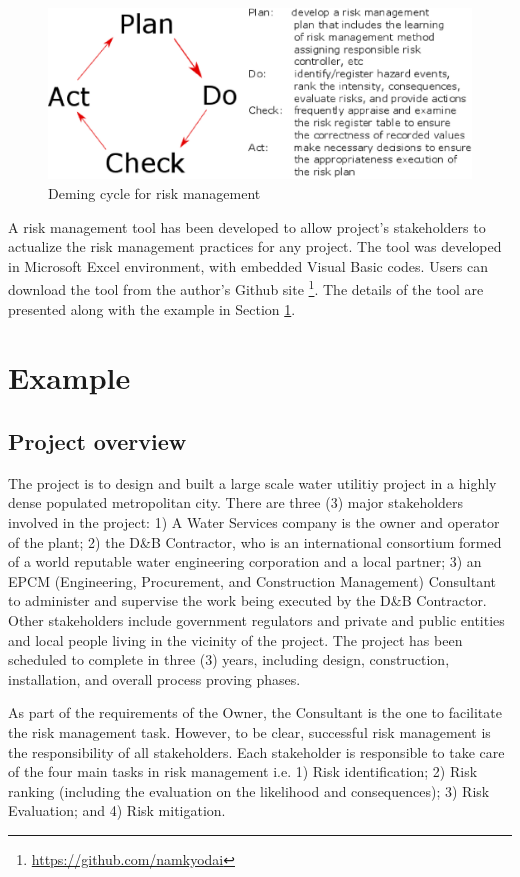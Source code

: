 \documentclass[10pt,halfline,a4paper]{ouparticle}
\let\oldurl\url
\let\linkurl\url
\let\url\oldurl
\begin{document}
\begin{figure}[!ht]
	\centering \includegraphics[scale=0.4]{demingcyclerisk} \caption{Deming cycle for risk management}
	\label{demingcyclerisk} 
\end{figure}

A risk management tool has been developed to allow project's stakeholders to actualize the risk management practices for any project. The tool was developed in Microsoft Excel environment, with embedded Visual Basic codes. Users can download the tool from the author's Github site \footnote{\linkurl{https://github.com/namkyodai}}. The details of the tool are presented along with the example in Section \ref{sec5}.

\section{Example}
\label{sec5}
\subsection{Project overview}
The project is to design and built a large scale water utilitiy project in a highly dense populated metropolitan city. There are three (3) major stakeholders involved in the project: 1) A Water Services company is the owner and operator of the plant; 2) the D\&B Contractor, who is an international consortium formed of a world reputable water engineering corporation and a local partner; 3) an EPCM (Engineering, Procurement, and Construction Management) Consultant to administer and supervise the work being executed by the D\&B Contractor. Other stakeholders include government regulators and private and public entities and local people living in the vicinity of the project. The project has been scheduled to complete in three (3) years, including design, construction, installation, and overall process proving phases.

As part of the requirements of the Owner, the Consultant is the one to facilitate the risk management task. However, to be clear, successful risk management is the responsibility of all stakeholders. Each stakeholder is responsible to take care of the four main tasks in risk management i.e. 1) Risk identification; 2) Risk ranking (including the evaluation on the likelihood and consequences); 3) Risk Evaluation; and 4) Risk mitigation.
\end{document}
